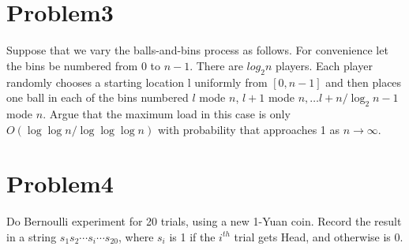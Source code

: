 \documentclass[12pt]{article}
\begin{document}
\section{Problem3}
Suppose that we vary the balls-and-bins process as follows. For convenience let the bins
be numbered from 0 to $n-1$. There are $log_2n$ players. Each player randomly chooses a
starting location l uniformly from $[0, n-1]$ and then places one ball in each of the bins
numbered $l$ mode $n$, $l + 1$ mode $n,\dots l+n/ \log_{2}n -1$ mode $n$. Argue that the maximum
load in this case is only $O(\log \log n / \log \log \log n)$ with probability that approaches 1 as
$n \to \infty$.


\section{Problem4}
Do Bernoulli experiment for 20 trials, using a new 1-Yuan coin. Record the result in a
string $s_1s_2 \cdots s_i \cdots s_{20}$, where $s_i$ is 1 if the $i^{th}$ trial gets Head, and otherwise is 0.
\end{document}
